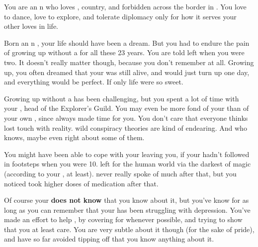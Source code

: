 \documentclass[char]{NeptuneBall}
\begin{document}
\name{\cPrincess{}}


You are an \pAtlantis{}n \cPrincess{\prince} who loves \cPrincess{\their} \cKing{\parent}, \cPrincess{\their} country, and \cPrincess{\their} forbidden \cDiplomat{\paramour} across the border in \pPacifica{}. You love to dance, love to explore, and tolerate diplomacy only for how it serves your other loves in life.

Born an \pAtlantis{}n \cPrincess{\prince}, your life should have been a dream. But you had to endure the pain of growing up without a \cQueen{\parent} for all these 23 years. You are told \cQueen{\they} left when you were two. It doesn't really matter though, because you don't remember \cQueen{\them} at all. Growing up, you often dreamed that your \cQueen{\parent} was still alive, and would just turn up one day, and everything would be perfect. If only life were so sweet.

Growing up without a \cQueen{\parent} has been challenging, but you spent a lot of time with your \cPlant{\uncle} \cPlant{}, head of the Explorer's Guild. You may even be more fond of your \cPlant{\uncle} than of your own \cKing{\parent}, since \cPlant{} always made time for you. You don't care that everyone thinks \cPlant{\they} \cPlant{\have} lost touch with reality. \cPlant{\Their} wild conspiracy theories are kind of endearing. And who knows, maybe \cPlant{\they} \cPlant{\are} even right about some of them.

You might have been able to cope with your \cQueen{\parent} leaving you, if your \cAriel{\sibling} hadn't followed in \cQueen{\their} footsteps when you were 10. \cAriel{} left for the human world via the darkest of magic (according to your \cKing{\parent}, at least). \cKing{\They} never really spoke of \cAriel{\them} much after that, but you noticed \cKing{\they} took higher doses of \cKing{\their} medication after that.

Of course your \cKing{\parent} {\bf does not know} that you know about it, but you've know for as long as you can remember that your \cKing{\parent} has been struggling with depression. You've made an effort to help \cKing{\them}, by covering for \cKing{\them} whenever possible, and trying to show \cKing{\them} that you at least care. You are very subtle about it though (for the sake of \cKing{\their} pride), and have so far avoided tipping \cKing{\them} off that you know anything about it.
\end{document}
